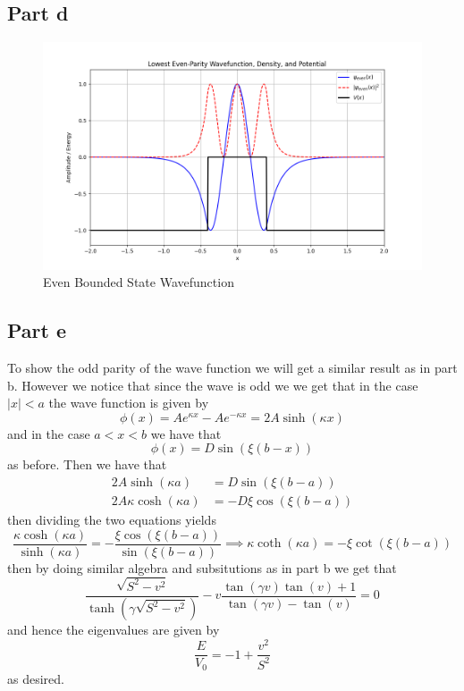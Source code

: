 \documentclass[12pt]{report}
\begin{document}
\subsection*{Part d}
%
\begin{figure}[H]
  \centering
  \includegraphics[scale=0.6]{even.png}
  \caption{Even Bounded State Wavefunction}
  \label{fig:enter-label}
\end{figure}

\subsection*{Part e}
To show the odd parity of the wave function we will get a similar result as in part b. However we notice that since the wave is odd we we get that in the case $|x| < a$ the wave function is given by
\begin{equation*}
  \phi(x) = Ae^{\kappa x} - Ae^{-\kappa x} = 2A\sinh(\kappa x)
\end{equation*}
and in the case $a < x < b$ we have that
\begin{equation*}
    \phi(x) = D \sin(\xi (b-x))
\end{equation*}
as before. Then we have that
\begin{align*}
  2A\sinh(\kappa a) &= D \sin(\xi(b-a)) \\
  2A\kappa \cosh(\kappa a) &= -D\xi\cos(\xi(b-a))
\end{align*}
then dividing the two equations yields
\begin{equation*}
    \frac{\kappa \cosh(\kappa a)}{\sinh(\kappa a)} = -\frac{\xi \cos(\xi(b-a))}{\sin(\xi(b-a))} \implies \kappa \coth(\kappa a) = -\xi \cot(\xi(b-a))
\end{equation*}
then by doing similar algebra and subsitutions as in part b we get that
\begin{equation*}
  \frac{\sqrt{S^2 - v^2}}{\tanh(\gamma \sqrt{S^2 - v^2})} - v \frac{\tan(\gamma v)\tan(v) + 1}{\tan(\gamma v) - \tan(v)} = 0
\end{equation*}
and hence the eigenvalues are given by 
\begin{equation*}
  \frac{E}{V_0} = -1 + \frac{v^2}{S^2}
\end{equation*}
as desired.
\end{document}
